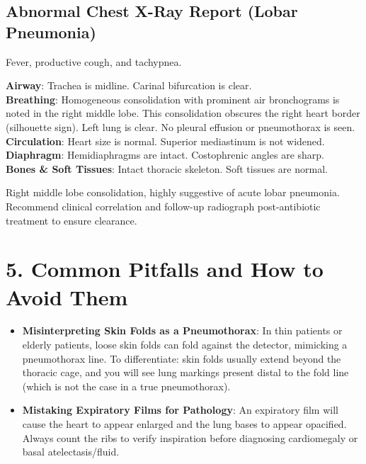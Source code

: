 \subsection*{Abnormal Chest X-Ray Report (Lobar Pneumonia)}
\begin{testbox}[Indications:]
Fever, productive cough, and tachypnea.
\end{testbox}
\begin{refbox}[Findings:]
\textbf{Airway}: Trachea is midline. Carinal bifurcation is clear.\\
\textbf{Breathing}: Homogeneous consolidation with prominent air bronchograms is noted in the right middle lobe. This consolidation obscures the right heart border (silhouette sign). Left lung is clear. No pleural effusion or pneumothorax is seen.\\
\textbf{Circulation}: Heart size is normal. Superior mediastinum is not widened.\\
\textbf{Diaphragm}: Hemidiaphragms are intact. Costophrenic angles are sharp.\\
\textbf{Bones \& Soft Tissues}: Intact thoracic skeleton. Soft tissues are normal.
\end{refbox}
\begin{pearlbox}[Impression:]
Right middle lobe consolidation, highly suggestive of acute lobar pneumonia. Recommend clinical correlation and follow-up radiograph post-antibiotic treatment to ensure clearance.
\end{pearlbox}


\section*{5. Common Pitfalls and How to Avoid Them}
\begin{itemize}
    \item \textbf{Misinterpreting Skin Folds as a Pneumothorax}: In thin patients or elderly patients, loose skin folds can fold against the detector, mimicking a pneumothorax line. To differentiate: skin folds usually extend beyond the thoracic cage, and you will see lung markings present distal to the fold line (which is not the case in a true pneumothorax).
    \item \textbf{Mistaking Expiratory Films for Pathology}: An expiratory film will cause the heart to appear enlarged and the lung bases to appear opacified. Always count the ribs to verify inspiration before diagnosing cardiomegaly or basal atelectasis/fluid.
\end{itemize}


